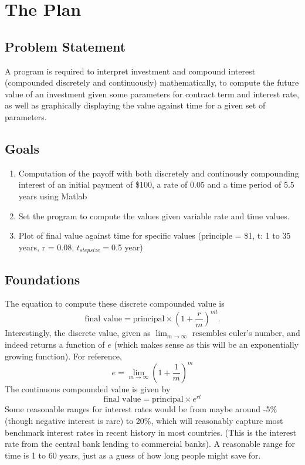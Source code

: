 \documentclass[10pt]{report}
\begin{document}
    \section*{The Plan}
    \subsection*{Problem Statement}
    A program is required to interpret investment and compound interest (compounded discretely and continuously) mathematically, to compute the future value of an investment given some parameters for contract term and interest rate, as well as graphically displaying the value against time for a given set of parameters.

    \subsection*{Goals}
    \begin{enumerate}
        \item Computation of the payoff with both discretely and continously compounding interest of an initial payment of \$100, a rate of 0.05 and a time period of 5.5 years using Matlab
        \item Set the program to compute the values given variable rate and time values.
        \item Plot of final value against time for specific values (principle = \$1, t: 1 to 35 years, r = 0.08, $t_{stepsize} = $0.5 year)
    \end{enumerate}
    \subsection*{Foundations}
    The equation to compute these discrete compounded value is $$\text{final value} = \text{principal} \times (1+ \frac{r}{m})^{mt}.$$ Interestingly, the discrete value, given as $\lim_{m\to\infty}$ resembles euler's number, and indeed returns a function of $e$ (which makes sense as this will be an exponentially growing function). For reference, $$e = \lim_{m \to\infty}(1 + \frac{1}{m})^m$$ The continuous compounded value is given by $$\text{final value} = \text{principal} \times e^{rt}$$ Some reasonable ranges for interest rates would be from maybe around -5\% (though negative interest is rare) to 20\%, which will reasonably capture most benchmark interest rates in recent history in most countries. (This is the interest rate from the central bank lending to commercial banks). A reasonable range for time is 1 to 60 years, just as a guess of how long people might save for.\\\\
\end{document}
